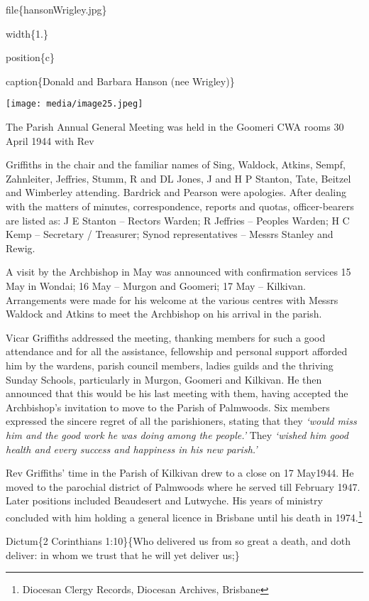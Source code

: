 file\{hansonWrigley.jpg\}

width\{1.\}

position\{c\}

caption\{Donald and Barbara Hanson (nee Wrigley)\}

\texttt{[image: media/image25.jpeg]}

The Parish Annual General Meeting was held in the Goomeri CWA rooms 30 April 1944 with Rev

Griffiths in the chair and the familiar names of Sing, Waldock, Atkins, Sempf, Zahnleiter, Jeffries, Stumm, R and DL Jones, J and H P Stanton, Tate, Beitzel and Wimberley attending. Bardrick and Pearson were apologies. After dealing with the matters of minutes, correspondence, reports and quotas, officer-bearers are listed as: J E Stanton -- Rectors Warden; R Jeffries -- Peoples Warden; H C Kemp -- Secretary / Treasurer; Synod representatives -- Messrs Stanley and Rewig.

A visit by the Archbishop in May was announced with confirmation services 15 May in Wondai; 16 May -- Murgon and Goomeri; 17 May -- Kilkivan. Arrangements were made for his welcome at the various centres with Messrs Waldock and Atkins to meet the Archbishop on his arrival in the parish.

Vicar Griffiths addressed the meeting, thanking members for such a good attendance and for all the assistance, fellowship and personal support afforded him by the wardens, parish council members, ladies guilds and the thriving Sunday Schools, particularly in Murgon, Goomeri and Kilkivan. He then announced that this would be his last meeting with them, having accepted the Archbishop's invitation to move to the Parish of Palmwoods. Six members expressed the sincere regret of all the parishioners, stating that they \emph{`would miss him and the good work he was doing among the people.'} They \emph{`wished him good health and every success and happiness in his new parish.'}

Rev Griffiths' time in the Parish of Kilkivan drew to a close on 17 May1944. He moved to the parochial district of Palmwoods where he served till February 1947. Later positions included Beaudesert and Lutwyche. His years of ministry concluded with him holding a general licence in Brisbane until his death in 1974.\footnote{Diocesan Clergy Records, Diocesan Archives, Brisbane}

Dictum\{2 Corinthians 1:10\}\{Who delivered us from so great a death, and doth deliver: in whom we trust that he will yet deliver us;\}

